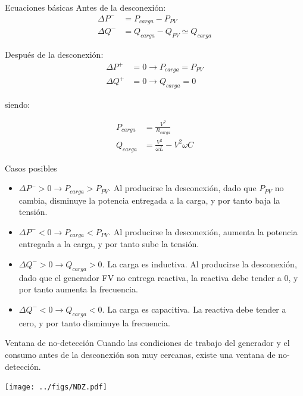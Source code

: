 \documentclass[aspectratio=169, usenames,svgnames,dvipsnames]{beamer}
\begin{document}
\begin{frame}[label={sec:org9b66810}]{Ecuaciones básicas}
Antes de la desconexión:
\begin{align*}
\Delta P^- &=P_{carga}-P_{PV}\\
\Delta Q^- &=Q_{carga}-Q_{PV}\simeq Q_{carga}
\end{align*}

Después de la desconexión:
\begin{align*}
\Delta P^+ &= 0 \rightarrow P_{carga} = P_{PV}\\
\Delta Q^+ &= 0 \rightarrow Q_{carga} = 0
\end{align*}

siendo:

\begin{align*}
P_{carga}&=\frac{V^{2}}{R_{carga}}\\
Q_{carga}&=\frac{V^{2}}{\omega L}-V^{2}\omega C
\end{align*}
\end{frame}
\begin{frame}[label={sec:org21c61c3}]{Casos posibles}
\begin{itemize}
\item \(\Delta P^{-}>0\rightarrow P_{carga}>P_{PV}\). Al producirse la
desconexión, dado que \(P_{PV}\) no cambia, disminuye la potencia
entregada a la carga, y por tanto baja la tensión.

\item \(\Delta P^{-}<0\rightarrow P_{carga}<P_{PV}\). Al producirse la
desconexión, aumenta la potencia entregada a la carga, y por tanto
sube la tensión.

\item \(\Delta Q^{-}>0\rightarrow Q_{carga}>0\). La carga es inductiva. Al
producirse la desconexión, dado que el generador FV no entrega
reactiva, la reactiva debe tender a 0, y por tanto aumenta la
frecuencia.

\item \(\Delta Q^{-}<0\rightarrow Q_{carga}<0\). La carga es capacitiva. La
reactiva debe tender a cero, y por tanto disminuye la frecuencia.
\end{itemize}
\end{frame}

\begin{frame}[label={sec:org384d76d}]{Ventana de no-detección}
Cuando las condiciones de trabajo del generador y el consumo antes de la
desconexión son muy cercanas, existe una ventana de no-detección.

\begin{center}
\begin{center}
\texttt{[image: ../figs/NDZ.pdf]}
\end{center}
\end{center}
\end{frame}
\end{document}
